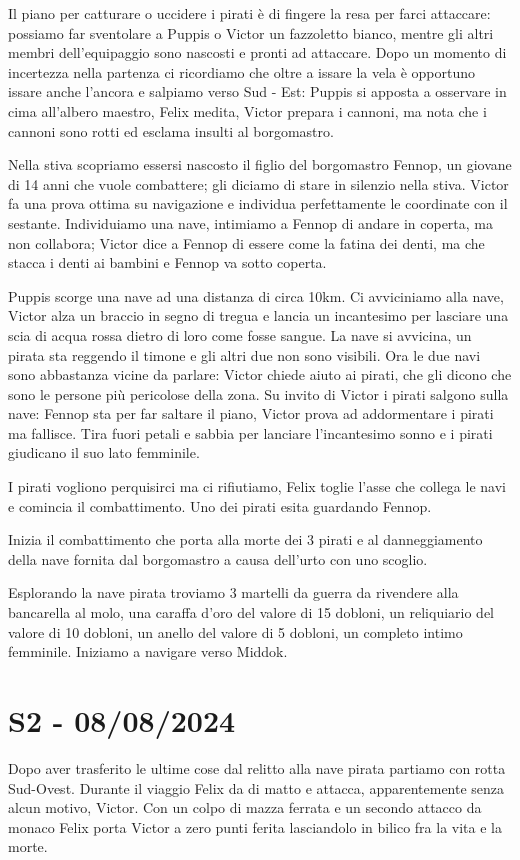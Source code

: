 \documentclass[letterpaper,twocolumn,openany, nodeprecatedcode, nomultitoc]{dndbook}
\begin{document}
Il piano per catturare o uccidere i pirati è di fingere la resa per farci attaccare: possiamo far sventolare a Puppis o Victor un fazzoletto bianco, mentre gli altri membri dell'equipaggio sono nascosti e pronti ad attaccare. Dopo un momento di incertezza nella partenza ci ricordiamo che oltre a issare la vela è opportuno issare anche l'ancora e salpiamo verso Sud - Est: Puppis si apposta a osservare in cima all'albero maestro, Felix medita, Victor prepara i cannoni, ma nota che i cannoni sono rotti ed esclama insulti al borgomastro.

Nella stiva scopriamo essersi nascosto il figlio del borgomastro Fennop, un giovane di 14 anni che vuole combattere; gli diciamo di stare in silenzio nella stiva. Victor fa una prova ottima su navigazione e individua perfettamente le coordinate con il sestante. Individuiamo una nave, intimiamo a Fennop di andare in coperta, ma non collabora; Victor dice a Fennop di essere come la fatina dei denti, ma che stacca i denti ai bambini e Fennop va sotto coperta.

Puppis scorge una nave ad una distanza di circa 10km. Ci avviciniamo alla nave, Victor alza un braccio in segno di tregua e lancia un incantesimo per lasciare una scia di acqua rossa dietro di loro come fosse sangue. La nave si avvicina, un pirata sta reggendo il timone e gli altri due non sono visibili. Ora le due navi sono abbastanza vicine da parlare: Victor chiede aiuto ai pirati, che gli dicono che sono le persone più pericolose della zona. Su invito di Victor i pirati salgono sulla nave: Fennop sta per far saltare il piano, Victor prova ad addormentare i pirati ma fallisce. Tira fuori petali e sabbia per lanciare l'incantesimo sonno e i pirati giudicano il suo lato femminile.

I pirati vogliono perquisirci ma ci rifiutiamo, Felix toglie l'asse che collega le navi e comincia il combattimento.
Uno dei pirati esita guardando Fennop.

Inizia il combattimento che porta alla morte dei 3 pirati e al danneggiamento della nave fornita dal borgomastro a causa dell'urto con uno scoglio.

Esplorando la nave pirata troviamo 3 martelli da guerra da rivendere alla bancarella al molo, una caraffa d'oro del valore di 15 dobloni,  un reliquiario del valore di 10 dobloni, un anello del valore di 5 dobloni, un completo intimo femminile. Iniziamo a navigare verso Middok.

\section{S2 - 08/08/2024}
Dopo aver trasferito le ultime cose dal relitto alla nave pirata partiamo con rotta Sud-Ovest. Durante il viaggio Felix da di matto e attacca, apparentemente senza alcun motivo, Victor. Con un colpo di mazza ferrata e un secondo attacco da monaco Felix porta Victor a zero punti ferita lasciandolo in bilico fra la vita e la morte.
\end{document}
